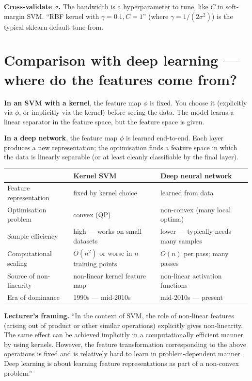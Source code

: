 \documentclass[11pt, a4paper]{article}
\newcommand{\thead}[1]{\textbf{#1}}
\begin{document}
\textbf{Cross-validate $\sigma$.} The bandwidth is a hyperparameter to tune, like $C$ in soft-margin SVM. ``RBF kernel with $\gamma = 0.1, C = 1$'' (where $\gamma = 1/(2\sigma^2)$) is the typical sklearn default tune-from.

\section{Comparison with deep learning --- where do the features come from?}

\textbf{In an SVM with a kernel}, the feature map $\phi$ is fixed. You choose it (explicitly via $\phi$, or implicitly via the kernel) before seeing the data. The model learns a linear separator in the feature space, but the feature space is given.

\textbf{In a deep network}, the feature map $\phi$ is learned end-to-end. Each layer produces a new representation; the optimisation finds a feature space in which the data is linearly separable (or at least cleanly classifiable by the final layer).

\begin{tabularx}{\linewidth}{@{}lXX@{}}
\toprule
& \thead{Kernel SVM} & \thead{Deep neural network} \\
\midrule
Feature representation & fixed by kernel choice                  & learned from data \\
Optimisation problem  & convex (QP)                               & non-convex (many local optima) \\
Sample efficiency     & high — works on small datasets          & lower — typically needs many samples \\
Computational scaling & $O(n^2)$ or worse in $n$ training points & $O(n)$ per pass; many passes \\
Source of non-linearity & non-linear kernel feature map         & non-linear activation functions \\
Era of dominance      & 1990s --- mid-2010s                       & mid-2010s --- present \\
\bottomrule
\end{tabularx}

\textbf{Lecturer's framing.} ``In the context of SVM, the role of non-linear features (arising out of product or other similar operations) explicitly gives non-linearity. The same effect can be achieved implicitly in a computationally efficient manner by using kernels. However, the feature transformation corresponding to the above operations is fixed and is relatively hard to learn in problem-dependent manner. Deep learning is about learning feature representations as part of a non-convex problem.''
\end{document}
